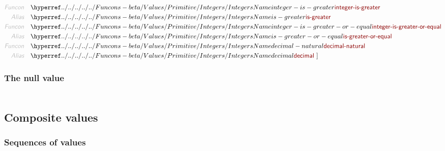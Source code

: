 \begin{align*}
  \KEY{Funcon} \quad & \NAMEHYPER{../../../../../Funcons-beta/Values/Primitive}{Integers}{integer-is-greater} \\
  \KEY{Alias} \quad & \NAMEHYPER{../../../../../Funcons-beta/Values/Primitive}{Integers}{is-greater} \\
  \KEY{Funcon} \quad & \NAMEHYPER{../../../../../Funcons-beta/Values/Primitive}{Integers}{integer-is-greater-or-equal} \\
  \KEY{Alias} \quad & \NAMEHYPER{../../../../../Funcons-beta/Values/Primitive}{Integers}{is-greater-or-equal} \\
  \KEY{Funcon} \quad & \NAMEHYPER{../../../../../Funcons-beta/Values/Primitive}{Integers}{decimal-natural} \\
  \KEY{Alias} \quad & \NAMEHYPER{../../../../../Funcons-beta/Values/Primitive}{Integers}{decimal}
  \ ]
\end{align*}
\subsubsection{The null value}\hypertarget{the-null-value}{}\label{the-null-value}

\begin{align*}
  [ \
  \KEY{Datatype} \quad & \NAMEHYPER{../../../../../Funcons-beta/Values/Primitive}{Null}{null-type} \\
  \KEY{Funcon} \quad & \NAMEHYPER{../../../../../Funcons-beta/Values/Primitive}{Null}{null-value} \\
  \KEY{Alias} \quad & \NAMEHYPER{../../../../../Funcons-beta/Values/Primitive}{Null}{null}
  \ ]
\end{align*}
\subsection{Composite values}\hypertarget{composite-values}{}\label{composite-values}

\subsubsection{Sequences of values}\hypertarget{sequences-of-values}{}\label{sequences-of-values}

\begin{align*}
  [ \
  \KEY{Funcon} \quad & \NAMEHYPER{../../../../../Funcons-beta/Values/Composite}{Sequences}{length} \\
  \KEY{Funcon} \quad & \NAMEHYPER{../../../../../Funcons-beta/Values/Composite}{Sequences}{index}
  \ ]
\end{align*}
